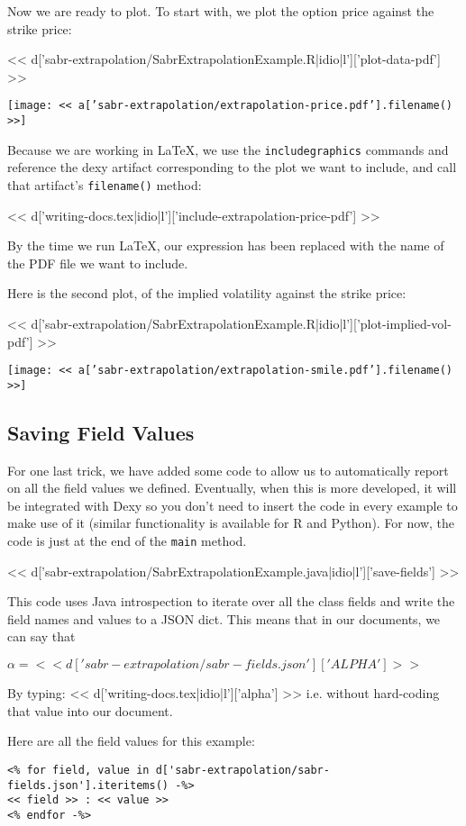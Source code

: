Now we are ready to plot. To start with, we plot the option price against the strike price:

<< d['sabr-extrapolation/SabrExtrapolationExample.R|idio|l']['plot-data-pdf'] >>

\texttt{[image: << a['sabr-extrapolation/extrapolation-price.pdf'].filename() >>]}

Because we are working in \LaTeX, we use the \verb|includegraphics| commands
and reference the dexy artifact corresponding to the plot we want to include,
and call that artifact's \verb|filename()| method:

<< d['writing-docs.tex|idio|l']['include-extrapolation-price-pdf'] >>

By the time we run \LaTeX, our expression has been replaced with the name of
the PDF file we want to include.

Here is the second plot, of the implied volatility against the strike price:

<< d['sabr-extrapolation/SabrExtrapolationExample.R|idio|l']['plot-implied-vol-pdf'] >>

\texttt{[image: << a['sabr-extrapolation/extrapolation-smile.pdf'].filename() >>]}

\subsection{Saving Field Values}

For one last trick, we have added some code to allow us to automatically report
on all the field values we defined. Eventually, when this is more developed, it
will be integrated with Dexy so you don't need to insert the code in every
example to make use of it (similar functionality is available for R and
Python). For now, the code is just at the end of the \verb|main| method.

<< d['sabr-extrapolation/SabrExtrapolationExample.java|idio|l']['save-fields'] >>

This code uses Java introspection to iterate over all the class fields and
write the field names and values to a JSON dict. This means that in our
documents, we can say that

$\alpha=<<d['sabr-extrapolation/sabr-fields.json']['ALPHA']>>$

By typing: << d['writing-docs.tex|idio|l']['alpha'] >>
i.e. without hard-coding that value into our document.

Here are all the field values for this example:

\begin{Verbatim}
<% for field, value in d['sabr-extrapolation/sabr-fields.json'].iteritems() -%>
<< field >> : << value >>
<% endfor -%>
\end{Verbatim}
